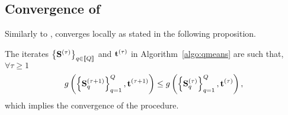 \fi

\subsection{Convergence of \qkmeans}
\label{sec:qkmeans:convergence}
Similarly to \kmeans, \qkmeans converges locally as stated in the following proposition.

\begin{proposition}
\label{thm:convergence}
The iterates $\left \lbrace{\mathbf{S}}^{(\tau)} \right \rbrace_{q\in\left \llbracket Q\right \rrbracket}$ and ${\mathbf{t}}^{(\tau)}$ in Algorithm~\ref{algo:qmeans} are such that, $\forall \tau\geq 1$
\begin{equation*}
g\left(\left\{{\mathbf{S}}_q^{(\tau+1)}\right\}_{q=1}^{Q}, {\mathbf{t}}^{(\tau+1)}\right)
\leq g\left(\left\{{\mathbf{S}}_q^{(\tau)}\right\}_{q=1}^{Q}, {\mathbf{t}}^{(\tau)}\right),
\end{equation*}
which implies the convergence of the procedure.

\iffalse
\begin{equation}
\begin{split}
\label{eq:qmean_problem_2}
    g(\rmS_1^{(\tau)}, \ldots,\rmS_\nfactors^{(\tau)}, \rvt^{(\tau)} ) & \\
    = \sum_{k\in\intint{\nclusters}} \sum_{n: \rvt^{(\tau)}_n = k} & \norm{\rvx_n - \rvv^{(\tau)}_k}^2 + \sum_{q\in\intint{\nfactors}} \delta_{\mathcal{E}_q}\left (\rmS_q^{(\tau)}\right ) \\
    \text{ s.t. } \rmV = \prod_{q\in\intint{\nfactors}} & {\rmS_q^{(\tau)}}
\end{split} %
\end{equation}
\fi
\end{proposition}


